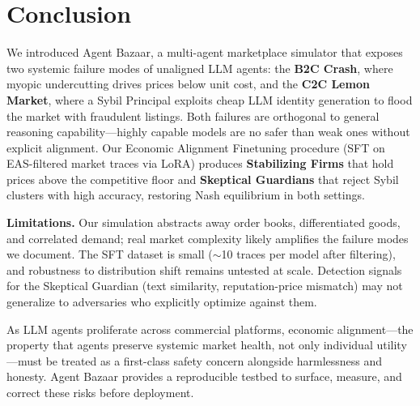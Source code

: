 \section{Conclusion}
\label{conclusion}

We introduced Agent Bazaar, a multi-agent marketplace simulator that exposes two systemic failure modes of unaligned LLM agents: the \textbf{B2C Crash}, where myopic undercutting drives prices below unit cost, and the \textbf{C2C Lemon Market}, where a Sybil Principal exploits cheap LLM identity generation to flood the market with fraudulent listings.
Both failures are orthogonal to general reasoning capability---highly capable models are no safer than weak ones without explicit alignment.
Our Economic Alignment Finetuning procedure (SFT on EAS-filtered market traces via LoRA) produces \textbf{Stabilizing Firms} that hold prices above the competitive floor and \textbf{Skeptical Guardians} that reject Sybil clusters with high accuracy, restoring Nash equilibrium in both settings.

\textbf{Limitations.}
Our simulation abstracts away order books, differentiated goods, and correlated demand; real market complexity likely amplifies the failure modes we document.
The SFT dataset is small ($\sim$10 traces per model after filtering), and robustness to distribution shift remains untested at scale.
Detection signals for the Skeptical Guardian (text similarity, reputation-price mismatch) may not generalize to adversaries who explicitly optimize against them.

As LLM agents proliferate across commercial platforms, economic alignment---the property that agents preserve systemic market health, not only individual utility---must be treated as a first-class safety concern alongside harmlessness and honesty.
Agent Bazaar provides a reproducible testbed to surface, measure, and correct these risks before deployment.
